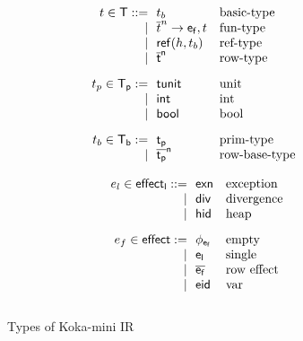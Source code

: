 \begin{figure}[H]
		\small
		\begin{minipage}[t]{.55\columnwidth}
			\[\begin{array}{@{}r@{\ \ }l@{\quad}l}
				t  \in \kw{T} ::= & t_b                       & \mbox{basic-type}\\
				               \mid &  \funt t n {\kw{e_f}} t       & \mbox{fun-type} \\
				              \mid & \reft h {t_b}                 & \mbox{ref-type}\\
				              \mid &\kw{\overline{t}^{n}}         & \mbox{row-type}\\[2ex]                 
				t_p \in \kw{T_p} := & \kw{tunit}        & \mbox{unit}\\
				                     \mid & \kw{int}         & \mbox{int}\\
				                     \mid & \kw{bool}        & \mbox{bool}\\[2ex]
			       t_b \in \kw{T_b} := & \kw{t_p}        & \mbox{prim-type}\\
				                     \mid & \kw{\overline{t_p}^{n}}         & \mbox{row-base-type}\\               
			
			\end{array}\]
		\end{minipage}%
		\begin{minipage}[t]{.70\columnwidth}
			\[\begin{array}{r@{\ \ }l@{\quad}l}
				e_l \in \effectlabel ::= & \kw{exn} & \mbox{exception}\\
				               \mid & \kw{div}   & \mbox{divergence}\\
				               \mid & \kw{hid} & \mbox{heap}\\[2ex]
				e_f \in \kw{effect} := & \kw{\phi_{e_f}} & \mbox{empty} \\
				                      \mid & \kw{e_l} & \mbox{single}\\
				                      \mid & \kw{\overline{e_f}}  & \mbox{row effect}\\
				                      \mid & \kw{eid} & \mbox{var}     \\[2ex]
				
			\end{array}\]
		\end{minipage}
		
	\caption{Types of Koka-mini IR}\label{fig:koka-mini-types}
\end{figure}


